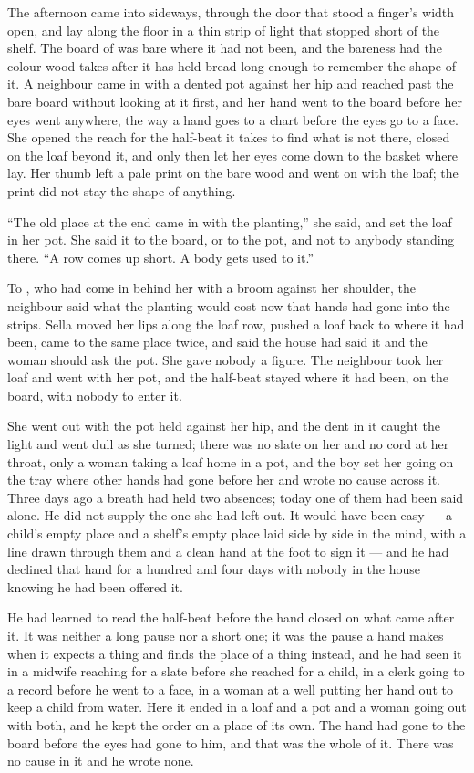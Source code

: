 The afternoon came into  sideways, through the door that stood a finger's width open, and lay along the floor in a thin strip of light that stopped short of the shelf. The board of  was bare where it had not been, and the bareness had the colour wood takes after it has held bread long enough to remember the shape of it. A neighbour came in with a dented pot against her hip and reached past the bare board without looking at it first, and her hand went to the board before her eyes went anywhere, the way a hand goes to a chart before the eyes go to a face. She opened the reach for the half-beat it takes to find what is not there, closed on the loaf beyond it, and only then let her eyes come down to the basket where  lay. Her thumb left a pale print on the bare wood and went on with the loaf; the print did not stay the shape of anything.

“The old place at the end came in with the planting,” she said, and set the loaf in her pot. She said it to the board, or to the pot, and not to anybody standing there. “A row comes up short. A body gets used to it.”

To , who had come in behind her with a broom against her shoulder, the neighbour said what the planting would cost now that hands had gone into the strips. Sella moved her lips along the loaf row, pushed a loaf back to where it had been, came to the same place twice, and said the house had said it and the woman should ask the pot. She gave nobody a figure. The neighbour took her loaf and went with her pot, and the half-beat stayed where it had been, on the board, with nobody to enter it.

She went out with the pot held against her hip, and the dent in it caught the light and went dull as she turned; there was no slate on her and no cord at her throat, only a woman taking a loaf home in a pot, and the boy set her going on the tray where other hands had gone before her and wrote no cause across it. Three days ago a breath had held two absences; today one of them had been said alone. He did not supply the one she had left out. It would have been easy --- a child's empty place and a shelf's empty place laid side by side in the mind, with a line drawn through them and a clean hand at the foot to sign it --- and he had declined that hand for a hundred and four days with nobody in the house knowing he had been offered it.

He had learned to read the half-beat before the hand closed on what came after it. It was neither a long pause nor a short one; it was the pause a hand makes when it expects a thing and finds the place of a thing instead, and he had seen it in a midwife reaching for a slate before she reached for a child, in a clerk going to a record before he went to a face, in a woman at a well putting her hand out to keep a child from water. Here it ended in a loaf and a pot and a woman going out with both, and he kept the order on a place of its own. The hand had gone to the board before the eyes had gone to him, and that was the whole of it. There was no cause in it and he wrote none.

